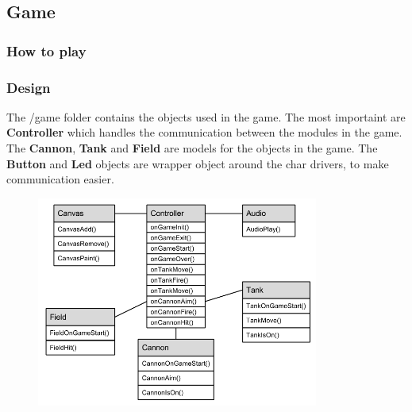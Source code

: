 \subsection{Game}

\subsubsection{How to play}

\subsubsection{Design}

The /game folder contains the objects used in the game. The most importaint are {\bf Controller}
which handles the communication between the modules in the game. The {\bf Cannon}, {\bf Tank} and
{\bf Field} are models for the objects in the game. The {\bf Button} and {\bf Led} objects are
wrapper object around the char drivers, to make communication easier.

\begin{figure}[h]
  \includegraphics[width=350px]{graphics/game_UML.png}
\end{figure}
